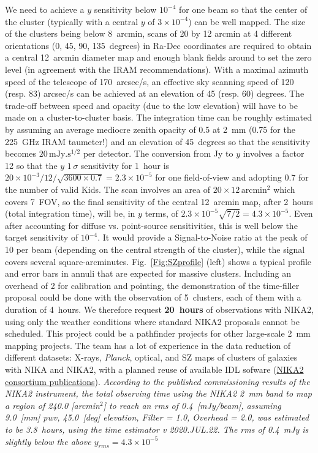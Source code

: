 \documentclass[10pt,a4paper,twoside,graphicx,color]{article}
\begin{document}
We need to achieve a $y$ sensitivity below $10^{-4}$ for one beam so
that the center of the cluster (typically with a central $y$ of
$3\times 10^{-4}$) can be well mapped. The size of the clusters being
below 8~arcmin, scans of 20 by 12 arcmin at 4 different orientations
(0, 45, 90, 135~degrees) in Ra-Dec coordinates are required to obtain
a central 12~arcmin diameter map and enough blank fields around to set
the zero level (in agreement with the IRAM recommendations). With a
maximal azimuth speed of the telescope of 170~arcsec/s, an effective
sky scanning speed of 120 (resp. 83) arcsec/s can be achieved at an
elevation of 45 (resp. 60) degrees. The trade-off between speed and
opacity (due to the low elevation) will have to be made on a
cluster-to-cluster basis. The integration time can be roughly
estimated by assuming an average mediocre zenith opacity of 0.5 at
2~mm (0.75 for the 225~GHz IRAM taumeter!) and an elevation of
45~degrees so that the sensitivity becomes $20\,\mathrm{mJy.s^{1/2}}$
per detector. The conversion from Jy to $y$ involves a factor 12 so
that the $y$ $1\,\sigma$ sensitivity for 1~hour is $20\times
10^{-3}/12/\sqrt{3600\times 0.7}=2.3\times 10^{-5}$ for one
field-of-view and adopting 0.7 for the number of valid Kids. The scan
involves an area of $20\times 12\,\mathrm{arcmin^2}$ which covers
7~FOV, so the final sensitivity of the central 12~arcmin map, after
2~hours (total integration time), will be, in $y$ terms, of $2.3\times
10^{-5}\sqrt{7/2}=4.3\times 10^{-5}$. Even after accounting for
diffuse vs. point-source sensitivities, this is well below the target
sensitivity of $10^{-4}$. It would provide a Signal-to-Noise ratio at
the peak of 10 per beam (depending on the central strength of the
cluster), while the signal covers several
square-arcminutes. Fig.~\ref{Fig:SZprofile} (left) shows a typical
profile and error bars in annuli that are expected for massive
clusters. Including an overhead of 2 for calibration and pointing, the
demonstration of the time-filler proposal could be done with the
observation of 5~clusters, each of them with a duration of 4~hours. We
therefore request {\bf 20~hours} of observations with NIKA2, using
only the weather conditions where standard NIKA2 proposals cannot be
scheduled. This project could be a pathfinder projects for other
large-scale 2~mm mapping projects. The team has a lot of experience in
the data reduction of different datasets: X-rays, {\sl Planck},
optical, and SZ maps of clusters of galaxies with NIKA and NIKA2, with
a planned reuse of available IDL sofware
(\href{https://ipag.osug.fr/nika2/Publications.html}{NIKA2 consortium
  publications}).  {\sl According to the published commissioning
  results of the NIKA2 instrument, the total observing time using the
  NIKA2 2~mm band to map a region of 240.0 [arcmin$^2$] to reach an
  rms of 0.4~[mJy/beam], assuming 9.0~[mm] pwv, 45.0~[deg] elevation,
  Filter = 1.0, Overhead = 2.0, was estimated to be 3.8~hours, using
  the time estimator v 2020.JUL.22. The rms of 0.4~mJy is slightly below the
  above $y_{rms}=4.3\times 10^{-5}$}
\end{document}
